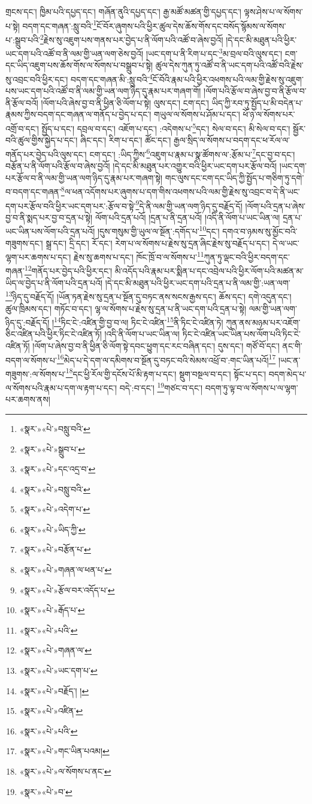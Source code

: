 གྲངས་དང་། ཁྱིམ་པའི་དཔྱད་དང་། གཞོན་ནུའི་དཔྱད་དང་། རྒྱ་མཚོ་མཚན་གྱི་དཔྱད་དང་། ལྟས་ཤེས་པ་ལ་སོགས་པ་སྟེ། བདག་དང་གཞན་:སླུ་བའི་\footnote{«སྣར་»«པེ་»བསླུ་བའི་}ངོ་བོར་ཞུགས་པའི་ཕྱིར་ཚུལ་དེས་ཆོས་གོས་དང་བསོད་སྙོམས་ལ་སོགས་པ་:སྒྲུབ་པའི་\footnote{«སྣར་»«པེ་»སྒྲུབ་པ་}རྗེས་སུ་འཇུག་པས་གནས་པར་བྱེད་པ་ནི་ལོག་པའི་འཚོ་བ་ཞེས་བྱའོ། །དེ་དང་མི་མཐུན་པའི་ཕྱིར་ཡང་དག་པའི་འཚོ་བ་ནི་ལམ་གྱི་ཡན་ལག་ཅེས་བྱའོ། །ཡང་དག་པ་ནི་རིག་པ་དང་\footnote{«སྣར་»«པེ་»དང་འདྲ་བ་}མ་བྲལ་བའི་ལུས་དང་། ངག་དང་ཡིད་འཇུག་པས་ཆོས་གོས་ལ་སོགས་པ་བསྒྲུབ་པ་སྟེ། ཚུལ་དེས་ཀུན་ཏུ་འཚོ་བ་ནི་ཡང་དག་པའི་འཚོ་བའི་རྗེས་སུ་འབྲང་བའི་ཕྱིར་དང་། བདག་དང་གཞན་མི་:སླུ་བའི་\footnote{«སྣར་»«པེ་»བསླུ་བའི་}ངོ་བོའི་རྣམ་པའི་ཕྱིར་འཕགས་པའི་ལམ་གྱི་རྗེས་སུ་འཇུག་པས་ཡང་དག་པའི་འཚོ་བ་ནི་ལམ་གྱི་ཡན་ལག་ཉིད་དུ་རྣམ་པར་གཞག་གོ། །ལོག་པའི་རྩོལ་བ་ཞེས་བྱ་བ་ནི་རྩོལ་བ་ནི་རྩོལ་བའོ། །ལོག་པའི་ཞེས་བྱ་བ་ནི་ཕྱིན་ཅི་ལོག་པ་སྟེ། ལུས་དང་། ངག་དང་། ཡིད་ཀྱི་རབ་ཏུ་སྤྱོད་པ་མི་བདེན་པ་རྣམས་ཀྱིས་བདག་དང་གཞན་ལ་གནོད་པ་བྱེད་པ་དང་། གཡུལ་ལ་སོགས་པ་ཤོམ་པ་དང་། ཕོ་ཉ་ལ་སོགས་པར་འགྲོ་བ་དང་། སྤྱོད་པ་དང་། དབྲལ་བ་དང་། འཇོག་པ་དང་། :འདེགས་པ་\footnote{«སྣར་»«པེ་»འདེག་པ་}དང་། སེལ་བ་དང་། མི་སེལ་བ་དང་། སྦྱོར་བའི་ཚུལ་གྱིས་སྐྱེད་པ་དང་། ཞིང་དང་། རིག་པ་དང་། ཚོང་དང་། རྒྱལ་སྲིད་ལ་སོགས་པ་བདག་དང་ཕ་རོལ་ལ་གནོད་པར་བྱེད་པའི་ལུས་དང་། ངག་དང་། :ཡིད་ཀྱིས་\footnote{«སྣར་»«པེ་»ཡིད་ཀྱི་}འཇུག་པ་རྣམ་པ་སྣ་ཚོགས་ལ་:རྩོམ་པ་\footnote{«སྣར་»«པེ་»བརྩོན་པ་}དང་བྱ་བ་དང་། བརྩོན་པ་ནི་ལོག་པའི་རྩོལ་བ་ཞེས་བྱའོ། །དེ་དང་མི་མཐུན་པར་འགྱུར་བའི་ཕྱིར་ཡང་དག་པར་རྩོལ་བའོ། །ཡང་དག་པར་རྩོལ་བ་ནི་ལམ་གྱི་ཡན་ལག་ཉིད་དུ་རྣམ་པར་གཞག་སྟེ། གང་ལུས་དང་ངག་དང་ཡིད་ཀྱི་སྤྱོད་པ་གཅིག་ཏུ་དགེ་བ་བདག་དང་གཞན་\footnote{«སྣར་»«པེ་»གཞན་ལ་ཕན་པ་}ལ་ཕན་འདོགས་པར་ཞུགས་པ་དག་གིས་འཕགས་པའི་ལམ་གྱི་རྗེས་སུ་འབྲང་བ་དེ་ནི་ཡང་དག་པར་རྩོལ་བའི་ཕྱིར་ཡང་དག་པར་:རྩོལ་བ་སྟེ་\footnote{«སྣར་»«པེ་»རྩོལ་བར་འདོད་པ་}དེ་ནི་ལམ་གྱི་ཡན་ལག་ཉིད་དུ་བརྗོད་དོ། །ལོག་པའི་དྲན་པ་ཞེས་བྱ་བ་ནི་སྨད་པར་བྱ་བ་དྲན་པ་སྟེ། ལོག་པའི་དྲན་པའོ། །དྲན་པ་ནི་དྲན་པའོ། །འདི་ནི་ལོག་པ་ཡང་ཡིན་ལ། དྲན་པ་ཡང་ཡིན་པས་ལོག་པའི་དྲན་པའོ། །དུས་གསུམ་གྱི་ཡུལ་ལ་སྔོན་:དགོད་པ་\footnote{«སྣར་»«པེ་»རྒོད་པ་}དང་། དགའ་བ་ཉམས་སུ་མྱོང་བའི་གཟུགས་དང་། སྒྲ་དང་། དྲི་དང་། རོ་དང་། རེག་པ་ལ་སོགས་པ་རྗེས་སུ་དྲན་ཞིང་རྗེས་སུ་བརྗོད་པ་དང་། དེ་ལ་ཡང་ལྷག་པར་ཆགས་པ་དང་། རྗེས་སུ་ཆགས་པ་དང་། ཁོང་ཁྲོ་བ་ལ་སོགས་པ་\footnote{«སྣར་»«པེ་»པའི་}ཀུན་ཏུ་ལྡང་བའི་ཕྱིར་བདག་དང་གཞན་\footnote{«སྣར་»«པེ་»གཞན་ལ་}གནོད་པར་བྱེད་པའི་ཕྱིར་དང་། མི་འདོད་པའི་རྣམ་པར་སྨིན་པ་དང་འབྲེལ་པའི་ཕྱིར་ལོག་པའི་མཚན་མ་ཡིད་ལ་བྱེད་པ་ནི་ལོག་པའི་དྲན་པའོ། །དེ་དང་མི་མཐུན་པའི་ཕྱིར་ཡང་དག་པའི་དྲན་པ་ནི་ལམ་གྱི་:ཡན་ལག་\footnote{«སྣར་»«པེ་»ཡང་དག་པ་}ཉིད་དུ་བརྗོད་དོ། །ཡོན་ཏན་རྗེས་སུ་དྲན་པ་སྔོན་དུ་བཏང་ནས་སངས་རྒྱས་དང་། ཆོས་དང་། དགེ་འདུན་དང་། ཚུལ་ཁྲིམས་དང་། གཏོང་བ་དང་། ལྷ་ལ་སོགས་པ་རྗེས་སུ་དྲན་པ་ནི་ཡང་དག་པའི་དྲན་པ་སྟེ། ལམ་གྱི་ཡན་ལག་ཉིད་དུ་:བརྗོད་དོ། །\footnote{«སྣར་»«པེ་»བརྗོད་། ། }ཏིང་ངེ་:འཛིན་གྱི་བྱ་བ་ལ། ཏིང་ངེ་འཛིན་\footnote{«སྣར་»«པེ་»འཛིན་}ནི་ཏིང་ངེ་འཛིན་ཏེ། ཀུན་ནས་མཉམ་པར་འཇོག་ཅིང་འཛིན་པའི་ཕྱིར་ཏིང་ངེ་འཛིན་ཏོ། །འདི་ནི་ལོག་པ་ཡང་ཡིན་ལ། ཏིང་ངེ་འཛིན་ཡང་ཡིན་པས་ལོག་པའི་ཏིང་ངེ་འཛིན་ཏོ། །ལོག་པ་ཞེས་བྱ་བ་ནི་ཕྱིན་ཅི་ལོག་སྟེ་དབང་ཕྱུག་དང་རང་བཞིན་དང་། དུས་དང་། གཙོ་བོ་དང་། ནང་གི་བདག་ལ་སོགས་པ་\footnote{«སྣར་»«པེ་»པའི་}མེད་པ་དེ་དག་ལ་དམིགས་བ་སྔོན་དུ་བཏང་བའི་སེམས་འཕྲོ་བ་:གང་ཡིན་པའོ།\footnote{«སྣར་»«པེ་»གང་ཡིན་པའམ།} །ཡང་ན་གཟུགས་:ལ་སོགས་པ་\footnote{«སྣར་»«པེ་»ལ་སོགས་པ་ནང་}དང་ཕྱི་རོལ་གྱི་དངོས་པོ་མི་རྟག་པ་དང་། སྡུག་བསྔལ་བ་དང་། སྟོང་པ་དང་། བདག་མེད་པ་ལ་སོགས་པའི་རྣམ་པ་དག་ལ་རྟག་པ་དང་། བདེ་:བ་དང་། \footnote{«སྣར་»«པེ་»བ་}གཙང་བ་དང་། བདག་ཏུ་ལྟ་བ་ལ་སོགས་པ་ལ་ལྷག་པར་ཆགས་ནས། 